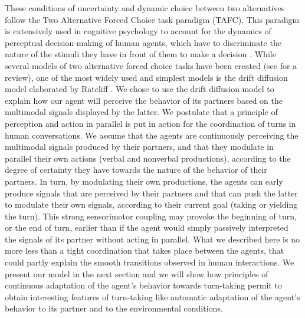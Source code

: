 These conditions of uncertainty and dynamic choice between two alternatives follow the Two Alternative Forced Choice task paradigm (TAFC). This paradigm is extensively used in cognitive psychology to account for
the dynamics of perceptual decision-making of human agents, which have to discriminate the nature of the
stimuli they have in front of them to make a decision \citep{bogacz_physics_2006}. While several models of two alternative forced choice tasks have been created (see \citep{bogacz_physics_2006} for a review), one of the most widely used and simplest models is the drift diffusion model elaborated by Ratcliff \citep{ratcliff_theory_1978}. 
We chose to use the drift diffusion model to explain how our agent will perceive the behavior of its partners based on the multimodal signals displayed by the latter. 
 We postulate that a principle of perception and action in parallel is put in action for the coordination
of turns in human conversations. We assume that the agents are continuously perceiving the multimodal signals
produced by their partners, and that they modulate in parallel their own actions (verbal and nonverbal
productions), according to the degree of certainty they have towards the nature of the behavior of their partners.
In turn, by modulating their own productions, the agents can early produce signals that are perceived by
their partners and that can push the latter to modulate their own signals, according to their current goal
(taking or yielding the turn). This strong sensorimotor coupling may provoke the beginning of turn, or the end
of turn, earlier than if the agent would simply passively interpreted the signals of its partner without acting in
parallel. What we described here is no more less than a tight coordination that takes place between the agents,
that could partly explain the smooth transitions observed in human interactions. We present our model in
the next section and we will show how principles of continuous adaptation of the agent's behavior towards turn-taking permit to obtain interesting features of turn-taking like automatic adaptation of the agent's behavior to its partner and to the environmental conditions. 
